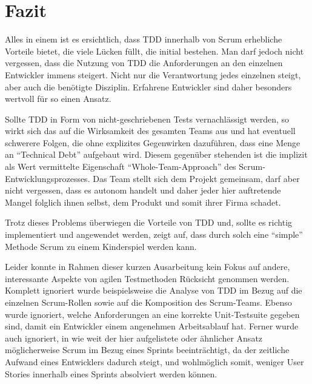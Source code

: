 \documentclass[12pt,DIV14,BCOR10mm,a4paper,twoside,parskip=half-,headsepline,headinclude,english,ngerman,bibliography=totocnumbered]{scrreprt}
\begin{document}
\chapter{Fazit}

Alles in einem ist es ersichtlich, dass TDD innerhalb von Scrum erhebliche Vorteile bietet, die viele Lücken füllt, die initial bestehen.
Man darf jedoch nicht vergessen, dass die Nutzung von TDD die Anforderungen an den einzelnen Entwickler immens steigert.
Nicht nur die Verantwortung jedes einzelnen steigt, aber auch die benötigte Disziplin.
Erfahrene Entwickler sind daher besonders wertvoll für so einen Ansatz.

Sollte TDD in Form von nicht-geschriebenen Tests vernachlässigt werden, so wirkt sich das auf die Wirksamkeit des gesamten Teams aus und hat eventuell schwerere Folgen, die ohne explizites Gegenwirken dazuführen, dass eine Menge an \enquote{Technical Debt} aufgebaut wird.
Diesem gegenüber stehenden ist die implizit als Wert vermittelte Eigenschaft \enquote{Whole-Team-Approach} des Scrum-Entwicklungsprozesses.
Das Team stellt sich dem Projekt gemeinsam, darf aber nicht vergessen, dass es autonom handelt und daher jeder hier auftretende Mangel folglich ihnen selbst, dem Produkt und somit ihrer Firma schadet.

Trotz dieses Problems überwiegen die Vorteile von TDD und, sollte es richtig implementiert und angewendet werden, zeigt auf, dass durch solch eine \enquote{simple} Methode Scrum zu einem Kinderspiel werden kann.

Leider konnte in Rahmen dieser kurzen Ausarbeitung kein Fokus auf andere, interessante Aspekte von agilen Testmethoden Rücksicht genommen werden.
Komplett ignoriert wurde beispielsweise die Analyse von TDD im Bezug auf die einzelnen Scrum-Rollen sowie auf die Komposition des Scrum-Teams.
Ebenso wurde ignoriert, welche Anforderungen an eine korrekte Unit-Testsuite gegeben sind, damit ein Entwickler einem angenehmen Arbeitsablauf hat.
Ferner wurde auch ignoriert, in wie weit der hier aufgelistete oder ähnlicher Ansatz möglicherweise Scrum im Bezug eines Sprints beeinträchtigt, da der zeitliche Aufwand eines Entwicklers dadurch steigt, und wohlmöglich somit, weniger User Stories innerhalb eines Sprints absolviert werden können.

\nocite{*}
\printbibliography
\end{document}
